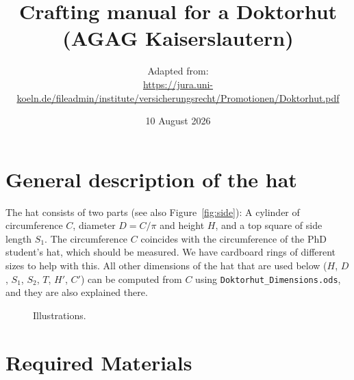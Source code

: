 \documentclass[a4paper,10pt]{article}
\title{Crafting manual for a Doktorhut (AGAG Kaiserslautern)}
\author{\footnotesize Adapted from:\\\footnotesize\url{https://jura.uni-koeln.de/fileadmin/institute/versicherungsrecht/Promotionen/Doktorhut.pdf}}
\date{10 August 2026}
\begin{document}
	\maketitle
	
	\section*{General description of the hat}
	
	The hat consists of two parts (see also Figure~\ref{fig:side}): A cylinder of circumference $ C $, diameter $ D=C/\pi $ and height $ H $, and a top square of side length $ S_1 $. The circumference $ C $ coincides with the circumference of the PhD student's hat, which should be measured. We have cardboard rings of different sizes to help with this. All other dimensions of the hat that are used below ($ H $, $ D $, $ S_1 $, $ S_2 $, $ T $, $ H' $, $ C' $) can be computed from $ C $ using \texttt{Doktorhut\_Dimensions.ods}, and they are also explained there.
	
	\begin{figure}[htb]
		
		\caption{Illustrations.}
	\end{figure}
	
%	
	

	
	\section*{Required Materials}
	
\end{document}
